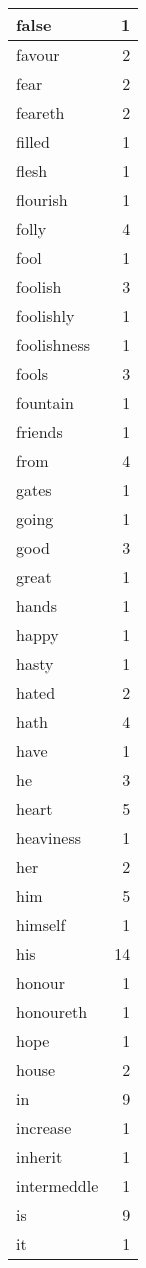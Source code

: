 \begin{center}
\begin{longtable}{l|r}
false & 1\\ \hline 
favour & 2\\ \hline 
fear & 2\\ \hline 
feareth & 2\\ \hline 
filled & 1\\ \hline 
flesh & 1\\ \hline 
flourish & 1\\ \hline 
folly & 4\\ \hline 
fool & 1\\ \hline 
foolish & 3\\ \hline 
foolishly & 1\\ \hline 
foolishness & 1\\ \hline 
fools & 3\\ \hline 
fountain & 1\\ \hline 
friends & 1\\ \hline 
from & 4\\ \hline 
gates & 1\\ \hline 
going & 1\\ \hline 
good & 3\\ \hline 
great & 1\\ \hline 
hands & 1\\ \hline 
happy & 1\\ \hline 
hasty & 1\\ \hline 
hated & 2\\ \hline 
hath & 4\\ \hline 
have & 1\\ \hline 
he & 3\\ \hline 
heart & 5\\ \hline 
heaviness & 1\\ \hline 
her & 2\\ \hline 
him & 5\\ \hline 
himself & 1\\ \hline 
his & 14\\ \hline 
honour & 1\\ \hline 
honoureth & 1\\ \hline 
hope & 1\\ \hline 
house & 2\\ \hline 
in & 9\\ \hline 
increase & 1\\ \hline 
inherit & 1\\ \hline 
intermeddle & 1\\ \hline 
is & 9\\ \hline 
it & 1\\ \hline 

\end{longtable}
\end{center}
